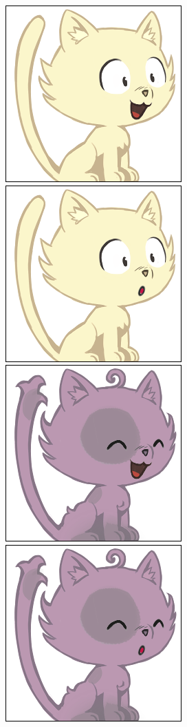 \documentclass[a4paper, 12pt]{article}
\begin{document}
  \includegraphics[scale=0.45]{out/13.png}
  \includegraphics[scale=0.45]{out/16.png}
  \includegraphics[scale=0.45]{out/20.png}
  \includegraphics[scale=0.45]{out/23.png}
\end{document}
